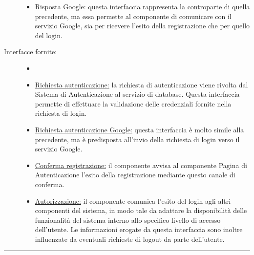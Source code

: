 \documentclass[11pt, a4paper]{article}
\theoremstyle{definition} %
\begin{document}
\begin{description}
\begin{itemize}
        \item \underline{Risposta Google:} questa interfaccia rappresenta
        la controparte di quella precedente, ma essa permette al componente
        di comunicare con il servizio Google, sia per ricevere l'esito
        della registrazione che per quello del login.
    \end{itemize}

    \item[Interfacce fornite:]
    \begin{itemize}
        \item[]

        \item \underline{Richiesta autenticazione:} la richiesta di
        autenticazione viene rivolta dal Sistema di Autenticazione
        al servizio di database. Questa interfaccia permette di effettuare
        la validazione delle credenziali fornite nella richiesta di
        login.

        \item \underline{Richiesta autenticazione Google:} questa
        interfaccia è molto simile alla precedente, ma è predisposta
        all'invio della richiesta di login verso il servizio Google.

        \item \underline{Conferma registrazione:} il componente avvisa
        al componente Pagina di Autenticazione l'esito della
        registrazione mediante questo canale di conferma.

        \item \underline{Autorizzazione:} il componente comunica
        l'esito del login agli altri componenti del sistema, in modo
        tale da adattare la disponibilità delle funzionalità del sistema
        interno allo specifico livello di accesso dell'utente.
        Le informazioni erogate da questa interfaccia sono inoltre
        influenzate da eventuali richieste di logout da parte dell'utente.
    \end{itemize}
\end{description}

\begin{center}
    \rule{5cm}{1pt}
\end{center}
\end{document}
